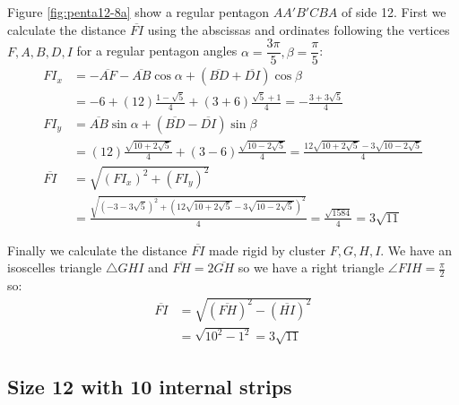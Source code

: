 \documentclass[11pt]{article}
\begin{document}
Figure \ref{fig:penta12-8a} show a regular pentagon $AA'B'CBA$ of side 12.
First we calculate the distance $\overline{FI}$ using the abscissas and ordinates following the vertices $F,A,B,D,I$ for a regular pentagon angles $\alpha=\dfrac{3\pi}5, \beta=\dfrac{\pi}5$:
\begin{align}
FI_x &= -\overline{AF} - \overline{AB}\cos\alpha + (\overline{BD} + \overline{DI})\cos\beta\nonumber\\
 &= -6 + (12)\frac{1-\sqrt5}4 + (3+6)\frac{\sqrt5+1}4 = -\frac{3+3\sqrt5}4\\
FI_y &= \overline{AB}\sin\alpha + (\overline{BD}-\overline{DI})\sin\beta\nonumber\\
 &= (12)\frac{\sqrt{10+2\sqrt5}}4 + (3-6)\frac{\sqrt{10-2\sqrt5}}4
 = \frac{12\sqrt{10+2\sqrt5} - 3\sqrt{10-2\sqrt5}}4\\
\overline{FI} &= \sqrt{(FI_x)^2 + (FI_y)^2}\nonumber\\
 &= \frac{\sqrt{(-3-3\sqrt5)^2 + (12\sqrt{10+2\sqrt5} - 3\sqrt{10-2\sqrt5})^2}}4
 = \frac{\sqrt{1584}}4 = 3\sqrt{11}
\end{align}

Finally we calculate the distance $\overline{FI}$ made rigid by cluster $F,G,H,I$. We have an isoscelles triangle $\triangle{GHI}$ and $\overline{FH}=2\overline{GH}$ so we have a right triangle $\angle{FIH}=\frac{\pi}2$ so: \begin{align}
\overline{FI} &= \sqrt{(\overline{FH})^2 - (\overline{HI})^2}\nonumber\\
 &= \sqrt{10^2 - 1^2} = 3\sqrt{11}
\end{align}


\subsection{Size 12 with 10 internal strips}
\end{document}
